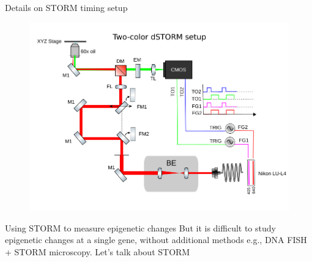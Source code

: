 \documentclass[aspectratio=1610]{beamer}					%
\begin{document}
\begin{frame}{Details on STORM timing setup}
\begin{figure}
\includegraphics[width=12cm]{dSTORM.png}
\end{figure}
\end{frame}

\begin{frame}{Using STORM to measure epigenetic changes}
But it is difficult to study epigenetic changes at a single gene, without additional methods e.g., DNA FISH + STORM microscopy. Let's talk about STORM
\end{frame}
\end{document}
